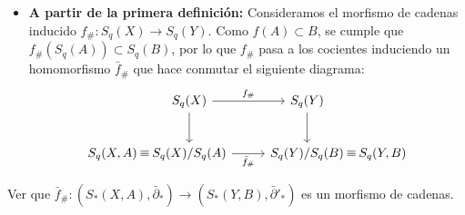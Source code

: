 \begin{itemize}
    \item \textbf{A partir de la primera definición:} Consideramos el morfismo de cadenas inducido $f_\# \colon S_q(X) \to S_q(Y)$. Como $f(A) \subset B$, se cumple que $f_\#(S_q(A)) \subset S_q(B)$, por lo que $f_\#$ pasa a los cocientes induciendo un homomorfismo $\bar{f}_\#$ que hace conmutar el siguiente diagrama:
    \[
    \begin{tikzcd}[column sep=2.6em, row sep=2.4em]
    &[-0.8cm] S_q(X) \arrow[r, "f_\#"] \arrow[d] & S_q(Y) \arrow[d] &[-0.8cm] \\
    S_q(X, A) \arrow[r, phantom, "\equiv"] & S_q(X)/S_q(A) \arrow[r, "\bar{f}_\#"'] & S_q(Y)/S_q(B) \arrow[r, phantom, "\equiv"] & S_q(Y, B)
    \end{tikzcd}
    \]
\end{itemize}

\begin{ejercicio}
Ver que $\bar{f}_\# \colon (S_*(X, A), \bar{\partial}_*) \to (S_*(Y, B), \bar{\partial}'_*)$ es un morfismo de cadenas.
\end{ejercicio}

